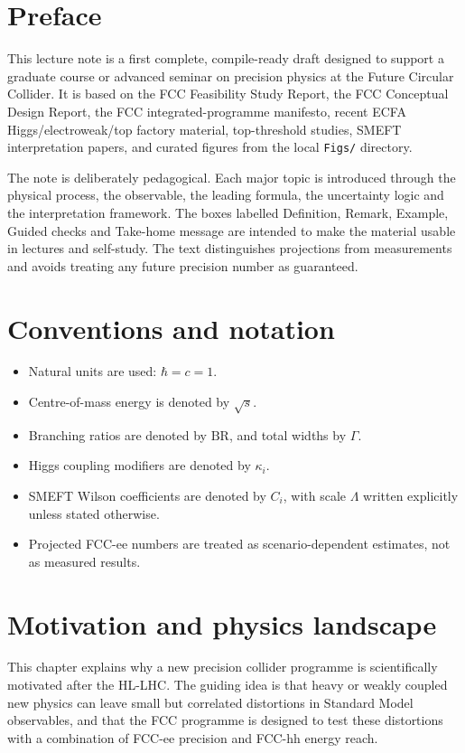 \documentclass[11pt,a4paper]{article}
\newcommand{\BR}{\mathrm{BR}}
\numberwithin{equation}{section}
\begin{document}
\tableofcontents
\newpage

\section*{Preface}
This lecture note is a first complete, compile-ready draft designed to support a graduate course or advanced seminar on precision physics at the Future Circular Collider. It is based on the FCC Feasibility Study Report, the FCC Conceptual Design Report, the FCC integrated-programme manifesto, recent ECFA Higgs/electroweak/top factory material, top-threshold studies, SMEFT interpretation papers, and curated figures from the local \texttt{Figs/} directory.

The note is deliberately pedagogical. Each major topic is introduced through the physical process, the observable, the leading formula, the uncertainty logic and the interpretation framework. The boxes labelled Definition, Remark, Example, Guided checks and Take-home message are intended to make the material usable in lectures and self-study. The text distinguishes projections from measurements and avoids treating any future precision number as guaranteed.

\section*{Conventions and notation}
\begin{itemize}[leftmargin=1.7em]
\item Natural units are used: \(\hbar=c=1\).
\item Centre-of-mass energy is denoted by \(\sqrt{s}\).
\item Branching ratios are denoted by \(\BR\), and total widths by \(\Gamma\).
\item Higgs coupling modifiers are denoted by \(\kappa_i\).
\item SMEFT Wilson coefficients are denoted by \(C_i\), with scale \(\Lambda\) written explicitly unless stated otherwise.
\item Projected FCC-ee numbers are treated as scenario-dependent estimates, not as measured results.
\end{itemize}


\newpage
\section{Motivation and physics landscape}
\begin{guidelinebox}
This chapter explains why a new precision collider programme is scientifically motivated after the HL-LHC. The guiding idea is that heavy or weakly coupled new physics can leave small but correlated distortions in Standard Model observables, and that the FCC programme is designed to test these distortions with a combination of FCC-ee precision and FCC-hh energy reach.
\end{guidelinebox}
\end{document}
